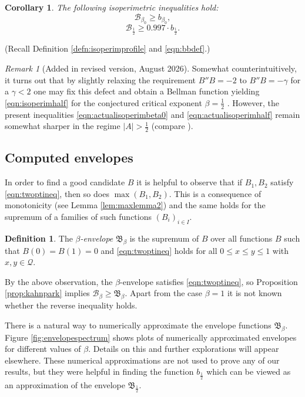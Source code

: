 \documentclass[12pt]{amsart}
\theoremstyle{plain}
\newtheorem{cor}[thm]{Corollary}
\theoremstyle{definition}
\newtheorem{defn}[thm]{Definition}
\theoremstyle{remark}
\newtheorem{rem}[thm]{Remark}
\numberwithin{equation}{section}
\begin{document}
\begin{cor}\label{cor:actualisoperim}
The following isoperimetric inequalities hold:
\begin{equation}\label{eqn:actualisoperimbeta0} \mathcal{B}_{\beta_0} \ge b_{\beta_0},
\end{equation}
\begin{equation}\label{eqn:actualisoperimhalf}
\mathcal{B}_\frac12 \ge 0.997\cdot b_\frac12. 
\end{equation}
\end{cor}
(Recall Definition \ref{defn:isoperimprofile} and \eqref{eqn:bbdef}.)
\begin{rem}[Added in revised version, August 2026]\label{rem:dirx}
Somewhat counterintuitively, it turns out that by slightly relaxing the requirement $B''B=-2$ to $B''B=-\gamma$ for a $\gamma<2$ one may fix this defect and obtain a Bellman function yielding \eqref{eqn:isoperimhalf} for the conjectured critical exponent $\beta=\frac12$ \cite{DIRX26}. However, the present inequalities \eqref{eqn:actualisoperimbeta0} and \eqref{eqn:actualisoperimhalf} remain somewhat sharper in the regime $|A|>\frac12$ (compare \cite[Remark 2.2]{DIRX26}).
\end{rem}

\subsection{Computed envelopes}\label{sec:computedenvelopes}
In order to find a good candidate $B$ it is helpful to observe that if $B_1, B_2$ satisfy \eqref{eqn:twoptineq}, then so does $\max(B_1,B_2)$. This is a consequence of monotonicity (see Lemma \ref{lem:maxlemma2}) and the same holds for the supremum of a families of such functions $(B_i)_{i\in I}$.
\begin{defn}\label{defn:envelope}
The \emph{$\beta$-envelope} $\mathfrak{B}_\beta$ is the supremum of $B$ over all functions $B$ such that $B(0)=B(1)=0$ and \eqref{eqn:twoptineq} holds for all $0\le x\le y\le 1$ with $x,y\in\mathcal{Q}$.
\end{defn}
By the above observation, the $\beta$-envelope satisfies \eqref{eqn:twoptineq}, so Proposition \ref{prop:kahnpark} implies $\mathcal{B}_\beta\ge \mathfrak{B}_\beta$.
Apart from the case $\beta=1$ it is not known whether the reverse inequality holds.

There is a natural way to numerically approximate the envelope functions $\mathfrak{B}_\beta$.
Figure \ref{fig:envelopespectrum} shows plots of numerically approximated envelopes for different values of $\beta$. Details on this and further explorations will appear elsewhere. These numerical approximations are not used to prove any of our results, but they were helpful in finding the function $b_{\frac12}$ which can be viewed as an approximation of the envelope $\mathfrak{B}_{\frac12}$.
\end{document}
